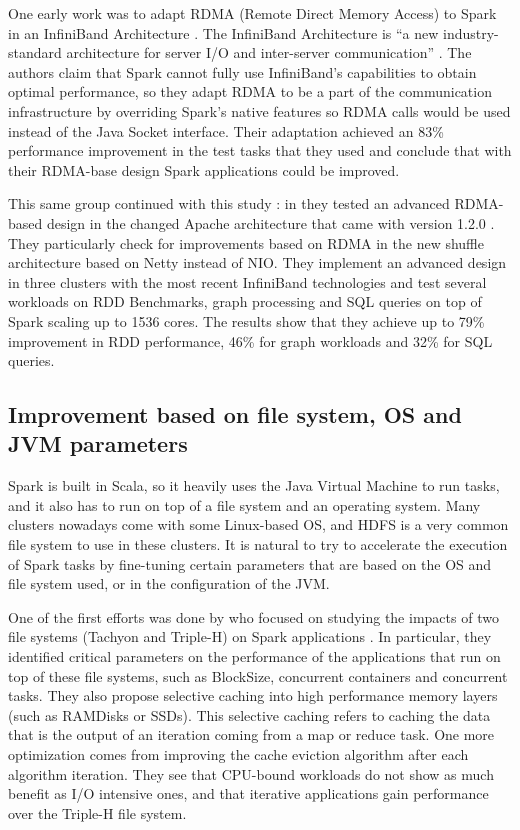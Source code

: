 \documentclass{article}
\begin{document}
One early work was to adapt RDMA (Remote Direct Memory Access) to Spark in an InfiniBand Architecture \cite{Lu2014}. The InfiniBand Architecture is ``a new industry-standard architecture for server I/O and inter-server communication'' \cite{pfister2001introduction}. The authors claim that Spark cannot fully use InfiniBand's capabilities to obtain optimal performance, so they adapt RDMA to be a part of the communication infrastructure by overriding Spark's native features so RDMA calls would be used instead of the Java Socket interface. Their adaptation achieved an 83\% performance improvement in the test tasks that they used and conclude that with their RDMA-base design Spark applications could be improved.

This same group continued with this study \cite{Lu2016}: in \citeyear{Lu2016} they tested an advanced RDMA-based design in the changed Apache architecture that came with version 1.2.0 \cite{Armbrust2015}. They particularly check for improvements based on RDMA in the new shuffle architecture based on Netty instead of NIO. They implement an advanced design in three clusters with the most recent InfiniBand technologies and test several workloads on RDD Benchmarks, graph processing and SQL queries on top of Spark scaling up to 1536 cores. The results show that they achieve up to 79\% improvement in RDD performance, 46\% for graph workloads and 32\% for SQL queries. 

\subsection{Improvement based on file system, OS and JVM parameters}

Spark is built in Scala, so it heavily uses the Java Virtual Machine to run tasks, and it also has to run on top of a file system and an operating system. Many clusters nowadays come with some Linux-based OS, and HDFS is a very common file system to use in these clusters. It is natural to try to accelerate the execution of Spark tasks by fine-tuning certain parameters that are based on the OS and file system used, or in the configuration of the JVM.

One of the first efforts was done by \citeauthor{Islam2015} who focused on studying the impacts of two file systems (Tachyon and Triple-H) on Spark applications \cite{Islam2015}. In particular, they identified critical parameters on the performance of the applications that run on top of these file systems, such as BlockSize, concurrent containers and concurrent tasks. They also propose selective caching into high performance memory layers (such as RAMDisks or SSDs). This selective caching refers to caching the data that is the output of an iteration coming from a map or reduce task. One more optimization comes from improving the cache eviction algorithm after each algorithm iteration. They see that CPU-bound workloads do not show as much benefit as I/O intensive ones, and that iterative applications gain performance over the Triple-H file system.
\end{document}

